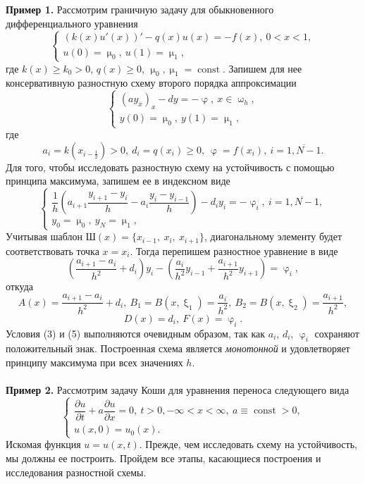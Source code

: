 \documentclass[a4paper, 12pt]{report}
\numberwithin{equation}{section}
\renewcommand{\geq}{\geqslant}
\renewcommand{\varphi}{\upvarphi}
\renewcommand{\mu}{\upmu}
\renewcommand{\omega}{\upomega}
\renewcommand{\xi}{\upxi}
\renewcommand{\d}{\partial}
\newcommand{\const}{\operatorname{const}}
\begin{document}
 \textbf{Пример 1.} Рассмотрим граничную задачу для обыкновенного дифференциального уравнения
 \begin{equation*}
 	\begin{cases}
 		(k(x)u'(x)) ' - q(x)u(x) = -f(x),\  0 < x< 1,\\
 		u(0)=\mu_0,\ u(1) = \mu_1,
 	\end{cases}
 \end{equation*}
 где
 $k(x) \geq k_0 > 0$, $q(x)\geq 0$, $\mu_0, \mu_1 = \const$. Запишем для нее консервативную разностную схему второго порядка аппроксимации
 \begin{equation*}
 	\begin{cases}
 		(a y_{\overline x})_x - dy = -\varphi,\ x \in \omega_h,\\
 		y(0) = \mu_0,\ y(1) = \mu_1,
 	\end{cases}
 \end{equation*}
 где
 $$a_i = k(x_{i-\frac 12})>0,\ d_i = q(x_i)\geq 0,\ \varphi = f(x_i),\ i = \overline{1, N-1}.$$
 Для того, чтобы исследовать разностную схему на устойчивость с помощью принципа максимума, запишем ее в индексном виде
 \begin{equation*}
 	\begin{cases}
 		\dfrac{1}{h}\left(a_{i+1} \dfrac{y_{i+1}-y_i}{h}- a_i \dfrac{y_i - y_{i-1}}{h}\right) - d_iy_i = -\varphi_i,\ i=\overline{1, N-1},\\
 		y_0 = \mu_0,\ y_N = \mu_1,
 	\end{cases}
 \end{equation*}
 Учитывая шаблон $\text{Ш}(x) = \{x_{i-1},\ x_i,\ x_{i+1}\}$, диагональному элементу будет соответствовать точка $x = x_i$. Тогда перепишем разностное уравнение в виде
 $$\left(\dfrac{a_{i+1}-a_i}{h^2} + d_i\right)y_i - \left(\dfrac{a_i}{h^2} y_{i-1} + \dfrac{a_{i+1}}{h^2}y_{i+1}\right) = \varphi_i,$$
 откуда
 $$A(x) = \dfrac{a_{i+1}-a_i}{h^2} + d_i,\ B_1 =B(x, \xi_1) = \dfrac{a_i}{h^2},\ B_2 = B(x, \xi_2)=\dfrac{a_{i+1}}{h^2},$$ $$D(x) = d_i,\ F(x) = \varphi_i.$$
 Условия (3) и (5) выполняются очевидным образом, так как $a_i$, $d_i$, $\varphi_i$ сохраняют положительный знак. Построенная схема является \textit{монотонной} и удовлетворяет принципу максимума при всех значениях $h$. 
 \\\\
 \textbf{Пример 2.} Рассмотрим задачу Коши для уравнения переноса следующего вида
 \begin{equation*}
	 	\begin{cases}
	 	\dfrac{\d u}{\d t} + a \dfrac{\d u}{\d x} = 0,\ t>0, -\infty < x < \infty,\ a \equiv \const > 0,\\
	 	u(x,0) = u_0(x).
	 	\end{cases}
 \end{equation*} Искомая функция $u = u(x,t)$. Прежде, чем исследовать схему на устойчивость, мы должны ее построить. Пройдем все этапы, касающиеся построения и исследования разностной схемы.
\end{document}

